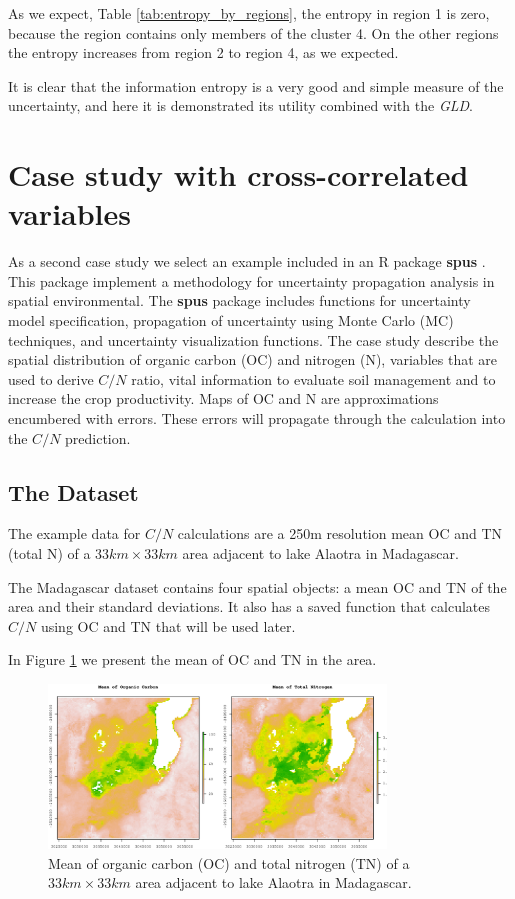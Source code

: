 As we expect, Table \ref{tab:entropy_by_regions}, the entropy in region 1 is zero, because the region contains only members of the cluster 4. On the other regions the entropy increases from region 2 to region 4, as we expected.

It is clear that the information entropy is a very good and simple measure of the uncertainty, and here it is demonstrated its utility combined with the \textit{GLD}.


\section{Case study with cross-correlated variables}\label{sec:enviromental}
As a second case study we select an example included in an R package \textbf{spus} \cite{Sawicka2016}. This package implement a methodology for uncertainty propagation analysis in spatial environmental. The \textbf{spus} package includes functions for uncertainty model specification, propagation of uncertainty using Monte Carlo (MC) techniques, and uncertainty visualization functions.
The case study describe the spatial distribution of organic carbon (OC) and nitrogen (N), variables that are used to derive $C/N$ ratio, vital information to evaluate soil management and to increase the crop productivity. Maps of OC and N are approximations encumbered with errors. These errors will propagate through the calculation into the $C/N$ prediction.

\subsection{The Dataset}
The example data for $C/N$ calculations are a 250m resolution mean OC and TN (total N) of a $33km \times 33km$ area adjacent to lake Alaotra in Madagascar.

The Madagascar dataset contains four spatial objects: a mean OC and TN of the area and their standard deviations. It also has a saved function that calculates $C/N$ using OC and TN that will be used later.

In Figure \ref{fig:mean_oc_tn} we present the mean of OC and TN in the area.

\begin{figure}[H]
    \centering
    \includegraphics[width=0.8\textwidth]{img/use_cases/spus/dataset_example.eps}
    \caption{Mean of organic carbon (OC) and total nitrogen (TN) of a $33km \times 33km$ area adjacent to lake Alaotra in Madagascar.}
    \label{fig:mean_oc_tn}
\end{figure}

